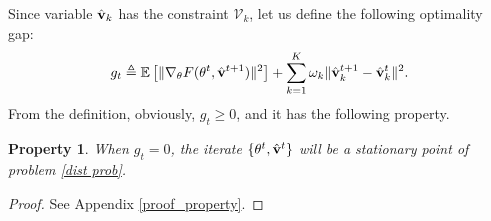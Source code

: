 \documentclass[twoside,journal]{IEEEtran}
\def\VectorFont{\bf}
\newcommand{\vv}{{\VectorFont v}}
\newtheorem{theorem}{Theorem}
\newtheorem{remark}{Remark}
\newtheorem{property}{Property}
\begin{document}
Since variable $\hat{\vv}_{k}$ has the constraint $\mathcal{V}_k$, let us define the following optimality gap:
\begin{align}\label{eqn: gap}
g_t\triangleq \mathbb{E}\left[\|\nabla_{\theta}F(\theta^t,\hat{\vv}^{t+1})\|^2\right]+\sum_{k=1}^K\omega_k\|\hat{\vv}_{k}^{t+1}-\hat{\vv}_{k}^{t}\|^2.
\end{align}
From the definition, obviously, $g_t\geq 0$, and it has the following property.
\begin{property}\label{pro_1}
When $g_t=0$, the iterate $\{\theta^t,\hat{\vv}^t\}$ will be a stationary
point of problem \eqref{dist prob}.
\end{property}
\begin{proof}
See Appendix \ref{proof_property}.
\end{proof}
%
\end{document}
